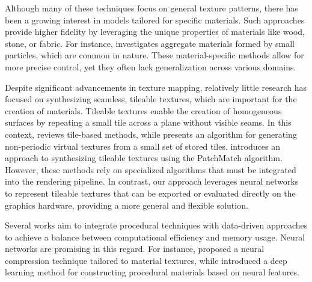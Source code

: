 Although many of these techniques focus on general texture patterns, there has been a growing interest in models tailored for specific materials. Such approaches provide higher fidelity by leveraging the unique properties of materials like wood, stone, or fabric. For instance, \citet{dorsey-2004} investigates aggregate materials formed by small particles, which are common in nature. These material-specific methods allow for more precise control, yet they often lack generalization across various domains.




Despite significant advancements in texture mapping, relatively little research has focused on synthesizing seamless, tileable textures, which are important for the creation of materials. Tileable textures enable the creation of homogeneous surfaces by repeating a small tile across a plane without visible seams. In this context, \citet{tileinteractive} reviews tile-based methods, while \citet{tilehard} presents an algorithm for generating non-periodic virtual textures from a small set of stored tiles. \citet{Moritz2017Texture} introduces an approach to synthesizing tileable textures using the PatchMatch algorithm. However, these methods rely on specialized algorithms that must be integrated into the rendering pipeline. In contrast, our approach leverages neural networks to represent tileable textures that can be exported or evaluated directly on the graphics hardware, providing a more general and flexible solution.


Several works aim to integrate procedural techniques with data-driven approaches to achieve a balance between computational efficiency and memory usage. Neural networks are promising in this regard. For instance, \citet{ntc2023} proposed a neural compression technique tailored to material textures, while \citet{match} introduced a deep learning method for constructing procedural materials based on neural features.

